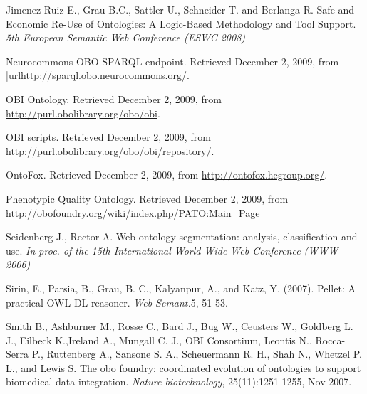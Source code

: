 \documentclass[jou]{ao2e}%
\begin{document}
\begin{thebibliography}{}
 Jimenez-Ruiz E., Grau B.C., Sattler U., Schneider T. and Berlanga R. Safe and Economic Re-Use of Ontologies: A Logic-Based Methodology and Tool Support. \textit{5th European Semantic Web Conference (ESWC 2008)} 


 Neurocommons OBO SPARQL endpoint. Retrieved December 2, 2009, from |url{http://sparql.obo.neurocommons.org/}.

 OBI Ontology. Retrieved December 2, 2009, from \url{http://purl.obolibrary.org/obo/obi}.

 OBI scripts. Retrieved December 2, 2009, from \url{http://purl.obolibrary.org/obo/obi/repository/}.

 OntoFox. Retrieved December 2, 2009, from \url{http://ontofox.hegroup.org/}.

 Phenotypic Quality Ontology. Retrieved December 2, 2009, from \url{http://obofoundry.org/wiki/index.php/PATO:Main_Page}

 Seidenberg J., Rector A. Web ontology segmentation: analysis, classification and use. \textit{In proc. of the 15th International World Wide Web Conference (WWW 2006)}

 Sirin, E., Parsia, B., Grau, B. C., Kalyanpur, A., and Katz, Y. (2007). Pellet: A practical OWL-DL reasoner. \textit{Web Semant.}5, 51-53. 
 
  Smith B., Ashburner M., Rosse C., Bard J., Bug W., Ceusters W., Goldberg L. J., Eilbeck K.,Ireland A., Mungall C. J., OBI Consortium, Leontis N., Rocca-Serra P., Ruttenberg A., Sansone S. A., Scheuermann R. H., Shah N., Whetzel P. L., and Lewis S. The obo foundry: coordinated evolution of ontologies to support biomedical data integration. \textit{Nature biotechnology}, 25(11):1251-1255, Nov 2007. 
 

\end{thebibliography}
\end{document}

